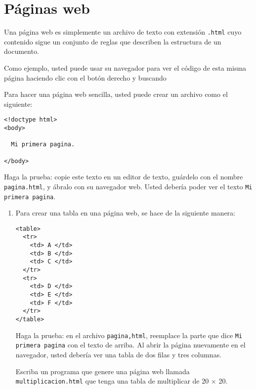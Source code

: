 \section{Páginas web}

Una página web es simplemente un archivo de texto con extensión
\lstinline!.html! cuyo contenido sigue un conjunto de reglas que
describen la estructura de un documento.

Como ejemplo, usted puede usar su navegador para ver el código de esta
misma página haciendo clic con el botón derecho y buscando

Para hacer una página web sencilla, usted puede crear un archivo como el
siguiente:

\begin{lstlisting}
<!doctype html>
<body>

  Mi primera pagina.

</body>
\end{lstlisting}

Haga la prueba: copie este texto en un editor de texto, guárdelo con el
nombre \lstinline!pagina.html!, y ábralo con su navegador web. Usted
debería poder ver el texto \lstinline!Mi primera pagina!.

\begin{enumerate}[1.]
\item
  Para crear una tabla en una página web, se hace de la siguiente
  manera:

\begin{lstlisting}
<table>
  <tr>
    <td> A </td>
    <td> B </td>
    <td> C </td>
  </tr>
  <tr>
    <td> D </td>
    <td> E </td>
    <td> F </td>
  </tr>
</table>
\end{lstlisting}

  Haga la prueba: en el archivo \lstinline!pagina,html!, reemplace la
  parte que dice \lstinline!Mi primera pagina! con el texto de arriba.
  Al abrir la página nuevamente en el navegador, usted debería ver una
  tabla de dos filas y tres columnas.

  Escriba un programa que genere una página web llamada
  \lstinline!multiplicacion.html! que tenga una tabla de multiplicar de
  20 × 20.
\end{enumerate}
